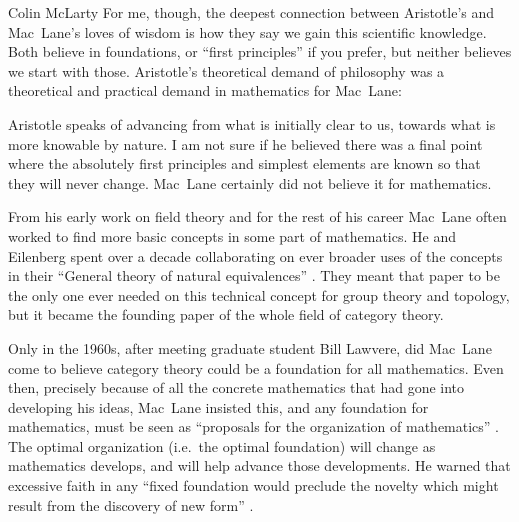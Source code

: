 \begin{artengenv}{Colin McLarty}
For me, though, the deepest connection between Aristotle's and Mac~Lane's loves of wisdom is how they say we gain this scientific knowledge.  Both believe in foundations, or ``first principles'' if you prefer, but neither believes we start with those. Aristotle's theoretical demand of philosophy was a theoretical and practical demand in mathematics for Mac~Lane:


Aristotle speaks of advancing from what is initially clear to us, towards what is more knowable by nature.  I am not sure if he believed there was a final point where the absolutely first principles and simplest elements are known so that they will never change.  Mac~Lane certainly did not believe it for mathematics.

From his early work on field theory \parencite{MacSchZero,MacSchNorm} and for the rest of his career Mac~Lane often worked to find more basic concepts in some part of mathematics. He and Eilenberg spent over a decade collaborating on ever broader uses of the concepts in their ``General theory of natural equivalences'' \parencite{GenTh}.  They meant that paper to be the only one ever needed on this technical concept for group theory and topology, but it became the founding paper of the whole field of category theory.

Only in the 1960s, after meeting graduate student Bill Lawvere, did Mac~Lane come to believe category theory could be a foundation for all mathematics.  Even then, precisely because of all the concrete mathematics that had gone into developing his ideas, Mac~Lane insisted this, and any foundation for mathematics, must be seen as ``proposals for the organization of mathematics'' \parencite[p.406]{MFF}.  The optimal organization (i.e.~the optimal foundation) will change as mathematics develops, and will help advance those developments.  He warned that excessive faith in any ``fixed foundation would preclude the novelty which might result from the discovery of new form'' \parencite[p.455]{MFF}.



\end{artengenv}
